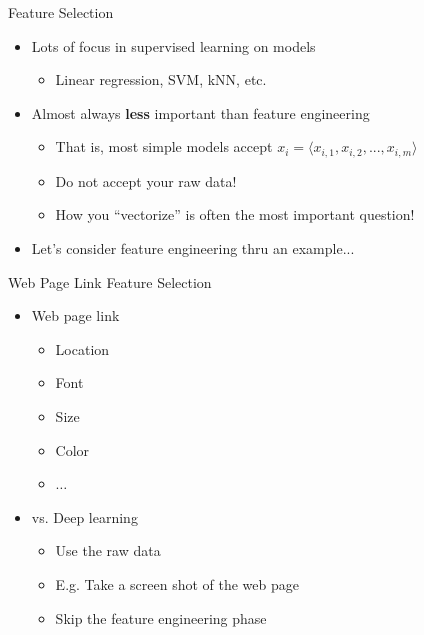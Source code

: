 \documentclass[aspectratio=169]{beamer}
\begin{document}
\begin{frame}{Feature Selection}

\begin{itemize}
\item Lots of focus in supervised learning on models
	\begin{itemize}
	\item Linear regression, SVM, kNN, etc.
	\end{itemize}
\item Almost always \textbf{less} important than feature engineering
	\begin{itemize}
	\item That is, most simple models accept $x_i = \langle x_{i,1}, x_{i,2}, ..., x_{i,m} \rangle$	
	\item Do not accept your raw data!
	\item How you ``vectorize'' is often the most important question!
	\end{itemize}
\item Let's consider feature engineering thru an example...
\end{itemize}
\end{frame}
\begin{frame}{Web Page Link Feature Selection}

\begin{itemize}
\item Web page link
\begin{itemize}
	\item Location
	\item Font 
	\item Size
	\item Color
	\item $\ldots$
\end{itemize}
\item vs. Deep learning
\begin{itemize}
	\item Use the raw data
	\item E.g. Take a screen shot of the web page
	\item Skip the feature engineering phase
\end{itemize}
\end{itemize}
\end{frame}
\end{document}
